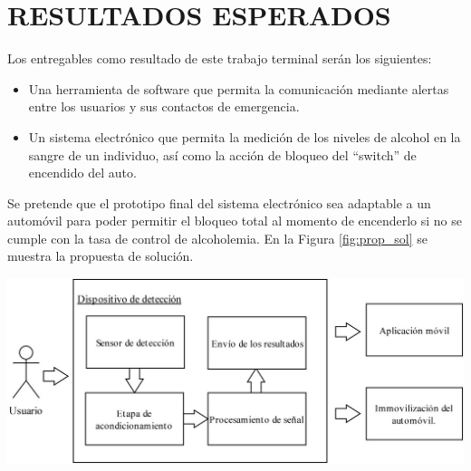 \section{RESULTADOS ESPERADOS}
Los entregables como resultado de este trabajo terminal serán los siguientes:
\begin{itemize}
    \item Una herramienta de software que permita la comunicación mediante alertas entre los usuarios y sus contactos de emergencia.
    \item Un sistema electrónico que permita la medición de los niveles de alcohol en la sangre de un individuo, así como la acción de bloqueo del “switch” de encendido del auto.
\end{itemize}
Se pretende que el prototipo final del sistema electrónico sea adaptable a un automóvil para poder permitir el bloqueo total al momento de encenderlo si no se cumple con la tasa de control de alcoholemia. En la Figura \ref{fig:prop_sol} se muestra la propuesta de solución.
\begin{center}
\includegraphics[scale=1]{Capitulo1/img/propuesta_de_solucion.jpg}
\label{fig:prop_sol}
\end{center}